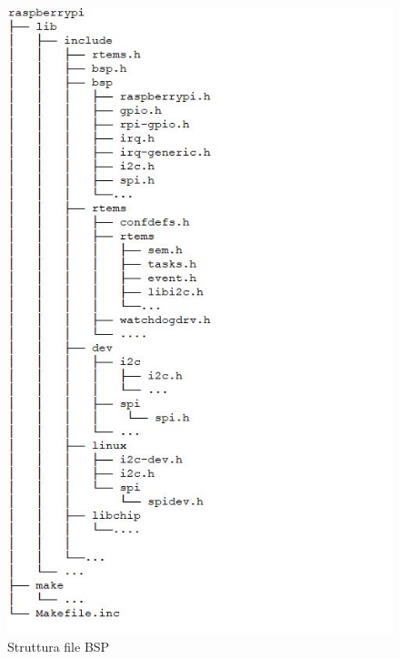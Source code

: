 \documentclass[12pt, a4paper, titlepage, oneside]{book}
\begin{document}
\begin{figure} [h]
\centering
    \includegraphics[scale = 1.0] {BSP_DIR_TREE.JPG}
    \caption{Struttura file BSP}
    \label{fig:Struttura cartelle BSP}
\end{figure}
\newpage
\end{document}
